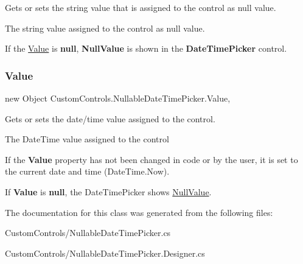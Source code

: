 Gets or sets the string value that is assigned to the control as null value. 

The string value assigned to the control as null value.

If the \hyperlink{class_custom_controls_1_1_nullable_date_time_picker_a10ca9af18d1ba8e6985257fcf374748b}{Value} is {\bfseries null}, {\bfseries Null\+Value} is shown in the {\bfseries Date\+Time\+Picker} control. \mbox{\label{class_custom_controls_1_1_nullable_date_time_picker_a10ca9af18d1ba8e6985257fcf374748b}} 
\subsubsection{\texorpdfstring{Value}{Value}}
{\footnotesize\ttfamily new Object Custom\+Controls.\+Nullable\+Date\+Time\+Picker.\+Value\hspace{0.3cm}{\ttfamily [get]}, {\ttfamily [set]}}



Gets or sets the date/time value assigned to the control. 

The Date\+Time value assigned to the control 

If the {\bfseries Value} property has not been changed in code or by the user, it is set to the current date and time (Date\+Time.\+Now).

If {\bfseries Value} is {\bfseries null}, the Date\+Time\+Picker shows \hyperlink{class_custom_controls_1_1_nullable_date_time_picker_a9efcb8f7340f813306a8e2ca388e156e}{Null\+Value}.

The documentation for this class was generated from the following files\+:\begin{DoxyCompactItemize}
\item 
Custom\+Controls/Nullable\+Date\+Time\+Picker.\+cs\item 
Custom\+Controls/Nullable\+Date\+Time\+Picker.\+Designer.\+cs\end{DoxyCompactItemize}
